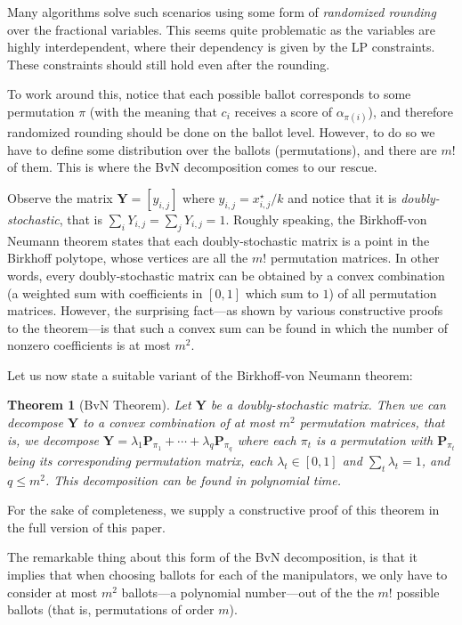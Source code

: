 \documentclass[letterpaper]{article} %
\newtheorem{theorem}{Theorem}
\theoremstyle{definition}
\newcommand\vecc{\mathbf}
\begin{document}
Many algorithms solve such scenarios using some form of \emph{randomized rounding} over the fractional variables. This seems quite problematic as the variables are highly interdependent, where their dependency is given by the LP constraints. These constraints  should still hold even after the rounding. 

To work around this, notice that
each possible ballot corresponds to some permutation $\pi$ (with the meaning that $c_i$ receives a score of $\alpha_{\pi(i)}$), and therefore randomized rounding should be done on the ballot level. However, to do so we have to define some distribution over the ballots (permutations), and there are $m!$ of them. This is where the BvN decomposition comes to our rescue. 

Observe the matrix $\vecc{Y}=[y_{i,j}]$ where $ y_{i,j}=x^\star_{i,j}/k$ and notice that it is \emph{doubly-stochastic}, that is $\sum_i Y_{i,j} = \sum_j Y_{i,j} = 1$.  Roughly speaking, the Birkhoff-von Neumann theorem states that each doubly-stochastic matrix is a point in the Birkhoff polytope, whose vertices are all the $m!$ permutation matrices.  In other words, every doubly-stochastic matrix can be obtained by a convex combination (a weighted sum with coefficients in $[0,1]$ which sum to $1$) of all permutation matrices. However, the surprising fact---as shown by various constructive proofs to the theorem---is that such a convex sum can be found in which the number of nonzero coefficients is at most $m^2$. 

Let us now state a suitable variant of the Birkhoff-von Neumann theorem:
\begin{theorem}[BvN Theorem]\label{thr:bvn}
	Let $\vecc{Y}$ be a doubly-stochastic matrix. Then we can decompose $\vecc{Y}$ to a convex combination of at most $m^2$ permutation matrices, that is, we decompose $\vecc{Y} = \lambda_1 \vecc{P}_{\pi_1}+ \cdots + \lambda_q \vecc{P}_{\pi_q}$ where each $\pi_t$ is a permutation with  $\vecc{P}_{\pi_t}$ being its corresponding permutation matrix, each $\lambda_t \in [0,1]$ and $\sum_{t} \lambda_t = 1$, and $q \leq m^2$. This decomposition can be found in polynomial time. 
\end{theorem}
For the sake of completeness, we supply a constructive proof of this theorem in the full version of this paper. 


The remarkable thing about this form of the BvN decomposition, is that it implies that when choosing ballots for each of the manipulators, we only have to consider at most $m^2$ ballots---a polynomial number---out of the the $m!$ possible ballots (that is, permutations of order $m$).
\end{document}
